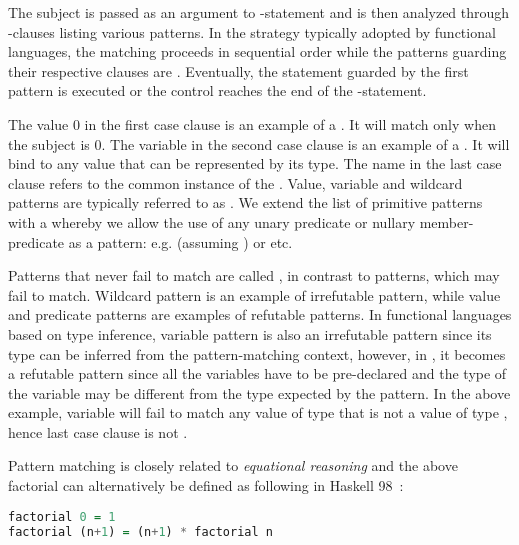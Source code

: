 \noindent
The subject  is passed as an argument to -statement and is 
then analyzed through -clauses listing various patterns. In the 
 strategy typically adopted by functional languages, the 
matching proceeds in sequential order while the patterns guarding their 
respective clauses are . Eventually, the statement guarded by the 
first  pattern is executed or the control reaches the end of 
the -statement.

The value 0 in the first case clause is an example of a . It 
will match only when the subject  is 0. The variable  in the 
second case clause is an example of a . It will bind to 
any value that can be represented by its type. The name \code{_} in the last 
case clause refers to the common instance of the . Value, 
variable and wildcard patterns are typically referred to as . We extend the list of primitive patterns with a  whereby we allow the use of any unary predicate or nullary 
member-predicate as a pattern: e.g.  (assuming 
) or  etc.

Patterns that never fail to match are called , in contrast to 
 patterns, which may fail to match. Wildcard pattern is an 
example of irrefutable pattern, while value and predicate patterns are examples 
of refutable patterns. In functional languages based on type inference, variable 
pattern is also an irrefutable pattern since its type can be inferred from the 
pattern-matching context, however, in \Cpp{}, it becomes a refutable pattern 
since all the variables have to be pre-declared and the type of the variable may 
be different from the type expected by the pattern. In the above example, 
variable  will fail to match any value of type  that is not a value
of type , hence last case clause is not .

Pattern matching is closely related to \emph{equational reasoning} and the above 
factorial can alternatively be defined as following in Haskell 98~\cite{Haskell98Book}:

\begin{lstlisting}[language=Haskell]
factorial 0 = 1
factorial (n+1) = (n+1) * factorial n
\end{lstlisting}


